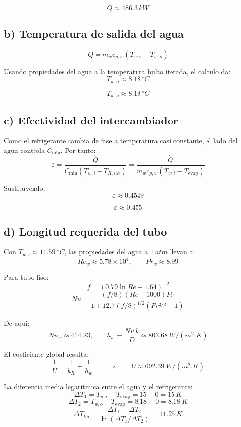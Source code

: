 \documentclass[11pt]{article}
\begin{document}
\[
\boxed{\dot Q \approx \SI{486.3}{kW}}
\]

\subsection*{b) Temperatura de salida del agua}

\[
\dot Q=\dot m_w c_{p,w}(T_{w,i}-T_{w,o})
\]

Usando propiedades del agua a la temperatura bulto iterada, el calculo da:
\[
T_{w,o}\approx \SI{8.18}{^\circ C}
\]

\[
\boxed{T_{w,o}\approx \SI{8.18}{^\circ C}}
\]

\subsection*{c) Efectividad del intercambiador}

Como el refrigerante cambia de fase a temperatura casi constante, el lado del agua controla \(C_{\min}\). Por tanto:
\[
\varepsilon=\frac{\dot Q}{C_{\min}(T_{w,i}-T_{R,\mathrm{sat}})}
=\frac{\dot Q}{\dot m_w c_{p,w}(T_{w,i}-T_{\mathrm{evap}})}
\]

Sustituyendo,
\[
\varepsilon \approx 0.4549
\]

\[
\boxed{\varepsilon \approx 0.455}
\]

\subsection*{d) Longitud requerida del tubo}

Con \(T_{w,b}\approx \SI{11.59}{^\circ C}\), las propiedades del agua a \(\SI{1}{atm}\) llevan a:
\[
Re_w \approx 5.78\times 10^4,
\qquad
Pr_w \approx 8.99
\]

Para tubo liso:
\[
f=\left(0.79\ln Re -1.64\right)^{-2}
\]
\[
Nu=\frac{(f/8)(Re-1000)Pr}{1+12.7(f/8)^{1/2}(Pr^{2/3}-1)}
\]

De aqui:
\[
Nu_w \approx 414.23,
\qquad
h_w=\frac{Nu\,k}{D}\approx \SI{803.68}{W/(m^2.K)}
\]

El coeficiente global resulta:
\[
\frac{1}{U}=\frac{1}{h_R}+\frac{1}{h_w}
\qquad \Longrightarrow \qquad
U\approx \SI{692.39}{W/(m^2.K)}
\]

La diferencia media logaritmica entre el agua y el refrigerante:
\[
\Delta T_1=T_{w,i}-T_{\mathrm{evap}}=15-0=\SI{15}{K}
\]
\[
\Delta T_2=T_{w,o}-T_{\mathrm{evap}}=8.18-0=\SI{8.18}{K}
\]
\[
\Delta T_{lm}=\frac{\Delta T_1-\Delta T_2}{\ln(\Delta T_1/\Delta T_2)}
=\SI{11.25}{K}
\]
\end{document}
